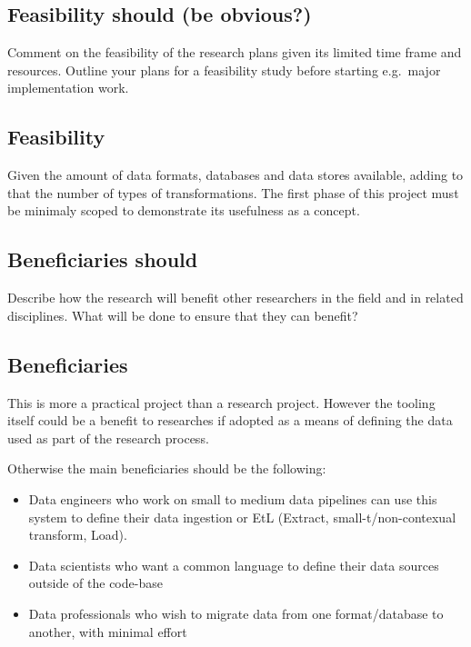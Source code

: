 \subsection{Feasibility should (be
obvious?)}\label{feasibility-should-be-obvious}

Comment on the feasibility of the research plans given its limited time
frame and resources. Outline your plans for a feasibility study before
starting e.g.~major implementation work.

\subsection{Feasibility}\label{feasibility}

Given the amount of data formats, databases and data stores available,
adding to that the number of types of transformations. The first phase
of this project must be minimaly scoped to demonstrate its usefulness as
a concept.

\subsection{Beneficiaries should}\label{beneficiaries-should}

Describe how the research will benefit other researchers in the field
and in related disciplines. What will be done to ensure that they can
benefit?

\subsection{Beneficiaries}\label{beneficiaries}

This is more a practical project than a research project. However the
tooling itself could be a benefit to researches if adopted as a means of
defining the data used as part of the research process.

Otherwise the main beneficiaries should be the following:

\begin{itemize}
\tightlist
\item
  Data engineers who work on small to medium data pipelines can use this
  system to define their data ingestion or EtL (Extract,
  small-t/non-contexual transform, Load).
\item
  Data scientists who want a common language to define their data
  sources outside of the code-base
\item
  Data professionals who wish to migrate data from one format/database
  to another, with minimal effort
\end{itemize}

